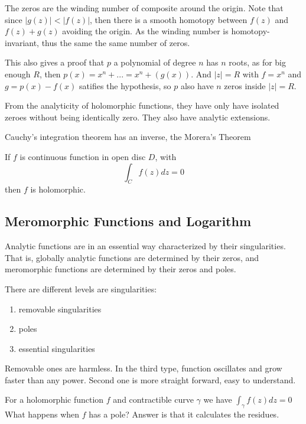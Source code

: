\documentclass[main.tex]{subfiles}
\begin{document}
\begin{theorem}
The zeros are the winding number of composite around the origin. Note that since $|g(z)| < |f(z)|$, then there is a smooth homotopy between $f(z)$ and $f(z) + g(z)$ avoiding the origin. As the winding number is homotopy-invariant, thus the same the same number of zeros.
\end{theorem}

\begin{remark}
This also gives a proof that $p$ a polynomial of degree $n$ has $n$ roots, as for big enough $R$, then $p(x) = x^n + ... = x^n + (g(x))$. And $|z| = R$ with $f = x^n$ and $g = p(x) - f(x)$ satifies the hypothesis, so $p$ also have $n$ zeros inside $|z| = R$.
\end{remark}

From the analyticity of holomorphic functions, they have only have isolated zeroes without being identically zero. They also have analytic extensions.

Cauchy's integration theorem has an inverse, the Morera's Theorem
\begin{theorem}
If $f$ is continuous function in open disc $D$, with 
$$
\int_C f(z) dz = 0
$$
then $f$ is holomorphic.
\end{theorem}


\subsection{Meromorphic Functions and Logarithm}

Analytic functions are in an essential way characterized by their singularities. That is, globally analytic functions are determined by their zeros, and meromorphic functions are determined by their zeros and poles. 

There are different levels are singularities:
\begin{enumerate}
    \item removable singularities
    \item poles
    \item essential singularities
\end{enumerate}
Removable ones are harmless. In the third type, function oscillates and grow faster than any power. Second one is more straight forward, easy to understand.

For a holomorphic function $f$ and contractible curve $\gamma$ we have 
$
\int_\gamma f(z) dz = 0
$
What happens when $f$ has a pole? Answer is that it calculates the residues.
\end{document}
